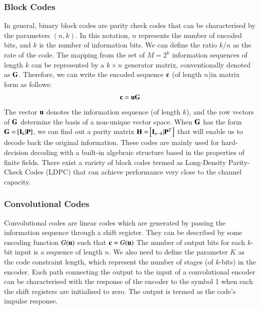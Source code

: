 \documentclass[12pt,a4paper,openright]{article}
\begin{document}
 
 \subsubsection{Block Codes} 
 In general, binary block codes  are parity check codes that can be characterised by the parameters $(n,k)$. In this notation, $n$ represents the number of encoded bits, and $k$ is the number of information bits. We can define the ratio $k/n$ as the rate of the code. The mapping from the set of $M=2^k$ information sequences of length $k$ can be represented by a $k\times n$ generator matrix, conventionally denoted as $\bf{G}$. Therefore, we can write the encoded sequence $\bf{c}$ (of length $n$)in matrix form as follows:
\[{\bf{c}} ={{\bf{u}}}{\bf{G}}\]
The vector  $\bf{u}$ denotes the information sequence (of length $k$), and the row vectors of $\bf{G}$ determine the basis of a non-unique vector space. When $\bf{G}$ has the form ${\bf{G = }}\left[ {{{\bf{I}}_k}{\bf{|P}}} \right]$,
we can find out a parity matrix ${\bf{H = }}\left[ {{{\bf{I}}_{n - k}}{\bf{|}}{{\bf{P}}^T}} \right]$ that will enable us to decode back the original information\cite{SklarBook}. These codes are mainly used for hard-decision decoding with a built-in algebraic structure based in the properties of finite fields. There exist a variety of block codes termed as Long-Density Parity-Check Codes (LDPC) that can achieve performance very close to the channel capacity.  


 \subsubsection{Convolutional Codes}
 Convolutional codes are linear codes which are generated by passing the information sequence through a shift register. They can be described by some encoding function $G({\bf{u}})$ such that ${\bf{c}}=G({\bf{u}})$ The number of output bits for each $k$-bit input is a sequence of length $n$. We also need to define the parameter $K$ as the code constraint length, which represent the number of stages (of $k$-bits) in the encoder. 
Each path connecting the output to the input of a convolutional encoder can be characterised with the response of the encoder 
to the symbol 1 when each the shift registers are initialised to zero. The output is termed as the code's impulse response.

   

\end{document}
